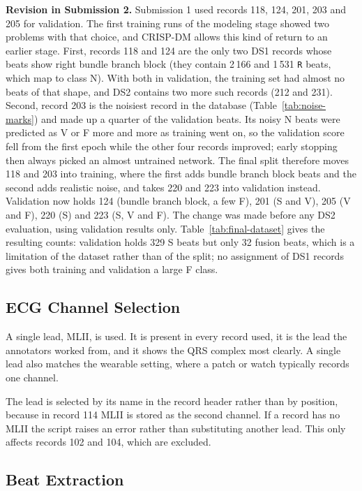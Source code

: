 \textbf{Revision in Submission 2.} Submission 1 used records 118, 124, 201, 203 and 205 for validation. The first training runs of the modeling stage showed two problems with that choice, and CRISP-DM allows this kind of return to an earlier stage. First, records 118 and 124 are the only two DS1 records whose beats show right bundle branch block (they contain 2\,166 and 1\,531 \texttt{R} beats, which map to class N). With both in validation, the training set had almost no beats of that shape, and DS2 contains two more such records (212 and 231). Second, record 203 is the noisiest record in the database (Table~\ref{tab:noise-marks}) and made up a quarter of the validation beats. Its noisy N beats were predicted as V or F more and more as training went on, so the validation score fell from the first epoch while the other four records improved; early stopping then always picked an almost untrained network. The final split therefore moves 118 and 203 into training, where the first adds bundle branch block beats and the second adds realistic noise, and takes 220 and 223 into validation instead. Validation now holds 124 (bundle branch block, a few F), 201 (S and V), 205 (V and F), 220 (S) and 223 (S, V and F). The change was made before any DS2 evaluation, using validation results only. Table~\ref{tab:final-dataset} gives the resulting counts: validation holds 329 S beats but only 32 fusion beats, which is a limitation of the dataset rather than of the split; no assignment of DS1 records gives both training and validation a large F class.

\subsection{ECG Channel Selection}

A single lead, MLII, is used. It is present in every record used, it is the lead the annotators worked from, and it shows the QRS complex most clearly. A single lead also matches the wearable setting, where a patch or watch typically records one channel.

The lead is selected by its name in the record header rather than by position, because in record 114 MLII is stored as the second channel. If a record has no MLII the script raises an error rather than substituting another lead. This only affects records 102 and 104, which are excluded.

\subsection{Beat Extraction}
\label{sec:beat-extraction}

